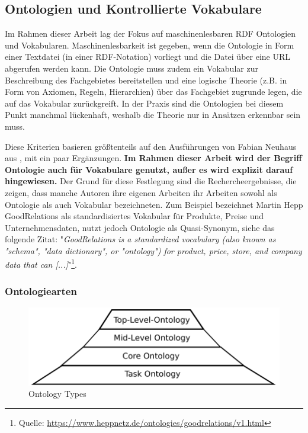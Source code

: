 \documentclass{article}
\begin{document}
\subsection{Ontologien und Kontrollierte Vokabulare}

Im Rahmen dieser Arbeit lag der Fokus auf maschinenlesbaren RDF Ontologien und Vokabularen.
Maschinenlesbarkeit ist gegeben, wenn die Ontologie in Form einer Textdatei (in einer RDF-Notation) vorliegt und die Datei über eine URL abgerufen werden kann.
Die Ontologie muss zudem ein Vokabular zur Beschreibung des Fachgebietes bereitstellen und eine logische Theorie (z.B. in Form von Axiomen, Regeln, Hierarchien) über das Fachgebiet zugrunde legen, die auf das Vokabular zurückgreift.
In der Praxis sind die Ontologien bei diesem Punkt manchmal lückenhaft, weshalb die Theorie nur in Ansätzen erkennbar sein muss.

Diese Kriterien basieren größtenteils auf den Ausführungen von Fabian Neuhaus aus \cite{neuhaus2018ontology}, mit ein paar Ergänzungen.
\textbf{Im Rahmen dieser Arbeit wird der Begriff Ontologie auch für Vokabulare genutzt, außer es wird explizit darauf hingewiesen.}
Der Grund für diese Festlegung sind die Rechercheergebnisse, die zeigen, dass manche Autoren ihre eigenen Arbeiten ihr Arbeiten sowohl als Ontologie als auch Vokabular bezeichneten.
Zum Beispiel bezeichnet Martin Hepp GoodRelations als standardisiertes Vokabular für Produkte, Preise und Unternehmensdaten, nutzt jedoch Ontologie als Quasi-Synonym, siehe das folgende Zitat: "\textit{GoodRelations is a standardized vocabulary (also known as "schema", "data dictionary", or "ontology") for product, price, store, and company data that can [...]}"\footnote{Quelle: \url{https://www.heppnetz.de/ontologies/goodrelations/v1.html}}.

\subsubsection{Ontologiearten}

\begin{figure}[H]
    \includegraphics[scale=0.4]{ontology-types}
    \centering
    \caption{Ontology Types}
\end{figure}
\end{document}
